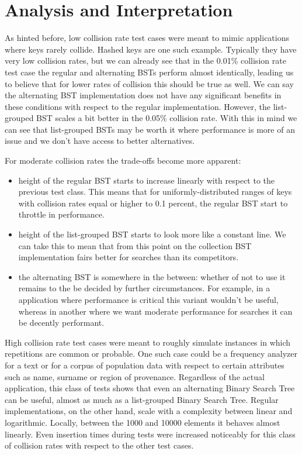 \documentclass[fleqn,10pt]{SelfArx} %
\begin{document}
\section{Analysis and Interpretation}
As hinted before, low collision rate test cases were meant to mimic applications where keys rarely collide. Hashed keys are one such example. Typically they have very low collision rates, but we can already see that in the 0.01\% collision rate test case the regular and alternating BSTs perform almost identically, leading us to believe that for lower rates of collision this should be true as well. We can say the alternating BST implementation does not have any significant benefits in these conditions with respect to the regular implementation. However, the list-grouped BST scales a bit better in the 0.05\% collision rate. With this in mind we can see that list-grouped BSTs may be worth it where performance is more of an issue and we don't have access to better alternatives.

For moderate collision rates the trade-offs become more apparent:
\begin{itemize}
	\item height of the regular BST starts to increase linearly with respect to the previous test class. This means that for uniformly-distributed ranges of keys with collision rates equal or higher to 0.1 percent, the regular BST start to throttle in performance.
	\item height of the list-grouped BST starts to look more like a constant line. We can take this to mean that from this point on the collection BST implementation fairs better for searches than its competitors.
	\item the alternating BST is somewhere in the between: whether of not to use it remains to the be decided by further circumstances. For example, in a application where performance is critical this variant wouldn't be useful, whereas in another where we want moderate performance for searches it can be decently performant.
\end{itemize}

High collision rate test cases were meant to roughly simulate instances in which repetitions are common or probable. One such case could be a frequency analyzer for a text or for a corpus of population data with respect to certain attributes such as name, surname or region of provenance. Regardless of the actual application, this class of tests shows that even an alternating Binary Search Tree can be useful, almost as much as a list-grouped Binary Search Tree. Regular implementations, on the other hand, scale with a complexity between linear and logarithmic. Locally, between the 1000 and 10000 elements it behaves almost linearly. Even insertion times during tests were increased noticeably for this class of collision rates with respect to the other test cases.
\end{document}
